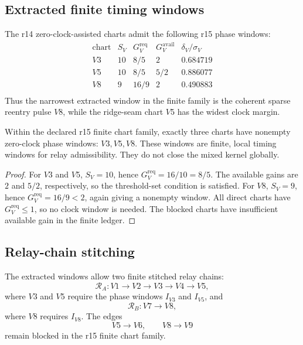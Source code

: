 \subsection{Extracted finite timing windows}
\label{subsec:v470-r15-extracted-finite-timing-windows}

The r14 zero-clock-assisted charts admit the following r15 phase windows:
\[
\begin{array}{c|c|c|c|c}
\text{chart} & S_V & G_V^{\mathrm{req}} & G_V^{\mathrm{avail}} & \delta_V/\sigma_V\\
\hline
V3 & 10 & 8/5 & 2 & 0.684719\\
V5 & 10 & 8/5 & 5/2 & 0.886077\\
V8 & 9 & 16/9 & 2 & 0.490883\\
\end{array}
\]
Thus the narrowest extracted window in the finite family is the coherent sparse
reentry pulse \(V8\), while the ridge-seam chart \(V5\) has the widest clock
margin.

\begin{proposition}
\label{prop:v470-r15-finite-zero-clock-window-extraction}
Within the declared r15 finite chart family, exactly three charts have nonempty
zero-clock phase windows: \(V3,V5,V8\).  These windows are finite, local timing
windows for relay admissibility.  They do not close the mixed kernel globally.
\end{proposition}

\begin{proof}
For \(V3\) and \(V5\), \(S_V=10\), hence
\(G_V^{\mathrm{req}}=16/10=8/5\).  The available gains are \(2\) and \(5/2\),
respectively, so the threshold-set condition is satisfied.  For \(V8\),
\(S_V=9\), hence \(G_V^{\mathrm{req}}=16/9<2\), again giving a nonempty window.
All direct charts have \(G_V^{\mathrm{req}}\leq1\), so no clock window is needed.
The blocked charts have insufficient available gain in the finite ledger.
\end{proof}

\subsection{Relay-chain stitching}
\label{subsec:v470-r15-relay-chain-stitching}

The extracted windows allow two finite stitched relay chains:
\[
\mathcal R_A:
V1\longrightarrow V2\longrightarrow V3\longrightarrow V4\longrightarrow V5,
\]
where \(V3\) and \(V5\) require the phase windows \(I_{V3}\) and \(I_{V5}\), and
\[
\mathcal R_B:
V7\longrightarrow V8,
\]
where \(V8\) requires \(I_{V8}\).
The edges
\[
V5\longrightarrow V6,
\qquad
V8\longrightarrow V9
\]
remain blocked in the r15 finite chart family.

